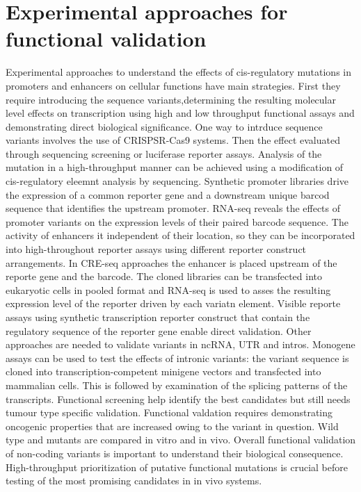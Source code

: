 \section{Experimental approaches for functional validation}
Experimental approaches to understand the effects of cis-regulatory mutations in promoters and enhancers on cellular functions have main strategies.
First they require introducing the sequence variants,determining the resulting molecular level effects on transcription using high and low throughput functional assays and demonstrating direct biological significance.
One way to intrduce sequence variants involves the use of CRISPSR-Cas9 systems.
Then the effect evaluated through sequencing screening or luciferase reporter assays.
Analysis of the mutation in a high-throughput manner can be achieved using a modification of cis-regulatory eleemnt analysis by sequencing.
Synthetic promoter libraries drive the expression of a common reporter gene and a downstream unique barcod sequence that identifies the upstream promoter.
RNA-seq reveals the effects of promoter variants on the expression levels of their paired barcode sequence.
The activity of enhancers it independent of their location, so they can be incorporated into high-throughout reporter assays using different reporter construct arrangements.
In CRE-seq approaches the enhancer is placed upstream of the reporte gene and the barcode.
The cloned libraries can be transfected into eukaryotic cells in pooled format and RNA-seq is used to asses the resulting expression level of the reporter driven by each variatn element.
Visible reporte assays using synthetic transcription reporter construct that contain the regulatory sequence of the reporter gene enable direct validation.
Other approaches are needed to validate variants in ncRNA, UTR and intros.
Monogene assays can be used to test the effects of intronic variants: the variant sequence is cloned into transcription-competent minigene vectors and transfected into mammalian cells.
This is followed by examination of the splicing patterns of the transcripts.
Functional screening help identify the best candidates  but still needs tumour type specific validation.
Functional valdation requires demonstrating oncogenic properties that are increased owing to the variant in question.
Wild type and mutants are compared in vitro and in vivo.
Overall functional validation of non-coding variants is important to understand their biological consequence.
High-throughput prioritization of putative functional mutations is crucial before testing of the most promising candidates in in vivo systems.
